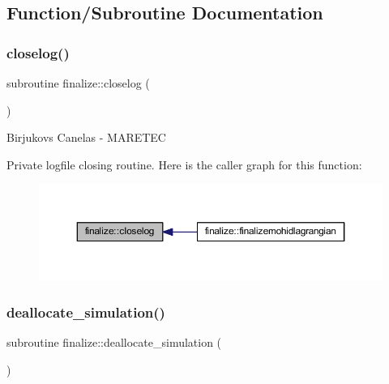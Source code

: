\subsection{Function/\+Subroutine Documentation}
\mbox{\label{namespacefinalize_ac448631d05fe5daa8739f32c95e89152}} 
\subsubsection{\texorpdfstring{closelog()}{closelog()}}
{\footnotesize\ttfamily subroutine finalize\+::closelog (\begin{DoxyParamCaption}{ }\end{DoxyParamCaption})\hspace{0.3cm}{\ttfamily [private]}}



Birjukovs Canelas -\/ M\+A\+R\+E\+T\+EC 

Private logfile closing routine. Here is the caller graph for this function\+:\nopagebreak
\begin{figure}[H]
\begin{center}
\leavevmode
\includegraphics[width=350pt]{namespacefinalize_ac448631d05fe5daa8739f32c95e89152_icgraph}
\end{center}
\end{figure}
\mbox{\label{namespacefinalize_a2b6733e6db5a768ac96ad9274685ad43}} 
\subsubsection{\texorpdfstring{deallocate\+\_\+simulation()}{deallocate\_simulation()}}
{\footnotesize\ttfamily subroutine finalize\+::deallocate\+\_\+simulation (\begin{DoxyParamCaption}{ }\end{DoxyParamCaption})\hspace{0.3cm}{\ttfamily [private]}}



